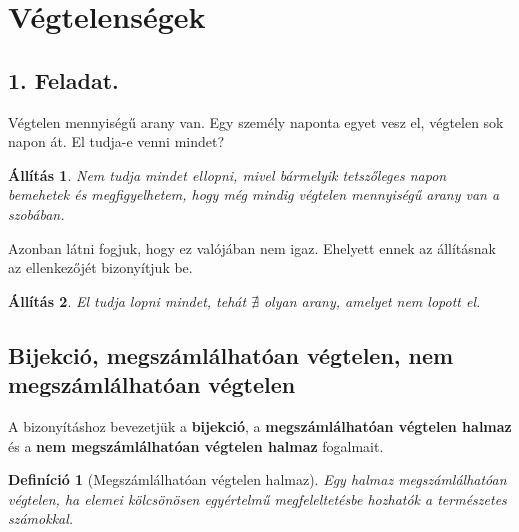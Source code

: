 \documentclass{article}
\newtheorem{proposition}{Állítás}
\newtheorem{definition}{Definíció}
\begin{document}
\section{Végtelenségek}
\subsection{1. Feladat.}
Végtelen mennyiségű arany van. Egy személy naponta egyet vesz el, végtelen sok napon át. El tudja-e venni mindet?

\begin{proposition}
  Nem tudja mindet ellopni, mivel bármelyik tetszőleges napon bemehetek és megfigyelhetem, hogy még mindig végtelen mennyiségű arany van a szobában.
\end{proposition}
Azonban látni fogjuk, hogy ez valójában nem igaz. Ehelyett ennek az állításnak az ellenkezőjét bizonyítjuk be.
\begin{proposition}
    El tudja lopni mindet, tehát $\nexists$ olyan arany, amelyet nem lopott el.
\end{proposition}

\subsection{Bijekció, megszámlálhatóan végtelen, nem megszámlálhatóan végtelen}

A bizonyításhoz bevezetjük a \textbf{bijekció}, a \textbf{megszámlálhatóan végtelen halmaz} és a \textbf{nem megszámlálhatóan végtelen halmaz} fogalmait.
\begin{definition}[Megszámlálhatóan végtelen halmaz]
    Egy halmaz megszámlálhatóan végtelen, ha elemei kölcsönösen egyértelmű megfeleltetésbe hozhatók a természetes számokkal.
\end{definition}
\end{document}
